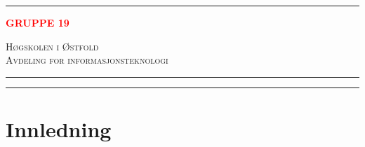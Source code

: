 \documentclass{article}
\begin{document}
\begin{titlepage}
	\rule{0.3\textwidth}{0.4pt}
	\vspace{0.3em}
	
    \textcolor{Red}{
        \uppercase{\textbf{Gruppe 19}}
	}
	
	\vfill %
	
	

	{\large\textsc{Høgskolen i Østfold\\	
		Avdeling for informasjonsteknologi}} %
	
	\vspace{0.1\textheight} %
	
	
	\rule{\textwidth}{0.4pt} %
	
	\vspace{2pt}\vspace{-\baselineskip} %
	
	\rule{\textwidth}{1pt} %

\end{titlepage}

\thispagestyle{empty} %

\newpage
\setcounter{page}{1}
\tableofcontents
\newpage

\setlength{\parindent}{0em}
\setlength{\parskip}{0,7em}

\section{Innledning}
\end{document}
